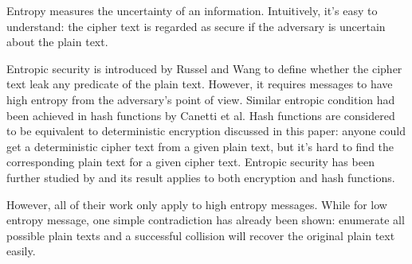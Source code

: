 \documentclass[10pt, conference, compsocconf]{IEEEtran}
\begin{document}
%
    Entropy\cite{entropy} measures the uncertainty of an information. Intuitively, it's easy to
    understand: the cipher text is regarded as secure
    if the adversary is uncertain about the plain text.

    Entropic security is introduced by Russel and Wang\cite{Russel02howto} to define
    whether the cipher text leak any predicate of the plain text. However,
    it requires messages to have high entropy from
    the adversary's point of view. Similar entropic condition had been
    achieved in hash functions by Canetti et al\cite{Canetti97towardsrealizing, Canetti_perfectlyone-way}.
    Hash functions are
    considered to be equivalent to deterministic encryption discussed in this
    paper: anyone could get a deterministic cipher text from a
    given plain text, but it's hard to find the corresponding plain text
    for a given cipher text. Entropic security has been further
    studied by \cite{entropic_wang}
    and its result applies to both encryption and hash functions.

    However, all of their work only apply to high entropy messages.
    While for low entropy message,
    one simple contradiction has already been
    shown: enumerate all possible plain texts and a successful collision
    will recover the original plain text easily.
\end{document}

